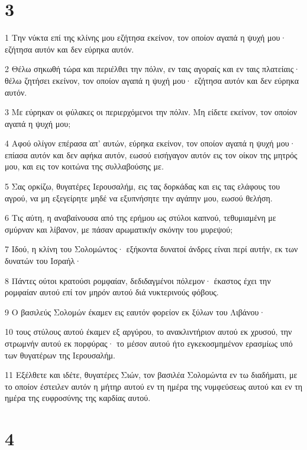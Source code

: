 \chapter{3}

\par 1 Την νύκτα επί της κλίνης μου εζήτησα εκείνον, τον οποίον αγαπά η ψυχή μου· εζήτησα αυτόν και δεν εύρηκα αυτόν.
\par 2 Θέλω σηκωθή τώρα και περιέλθει την πόλιν, εν ταις αγοραίς και εν ταις πλατείαις· θέλω ζητήσει εκείνον, τον οποίον αγαπά η ψυχή μου· εζήτησα αυτόν και δεν εύρηκα αυτόν.
\par 3 Με εύρηκαν οι φύλακες οι περιερχόμενοι την πόλιν. Μη είδετε εκείνον, τον οποίον αγαπά η ψυχή μου;
\par 4 Αφού ολίγον επέρασα απ' αυτών, εύρηκα εκείνον, τον οποίον αγαπά η ψυχή μου· επίασα αυτόν και δεν αφήκα αυτόν, εωσού εισήγαγον αυτόν εις τον οίκον της μητρός μου, και εις τον κοιτώνα της συλλαβούσης με.
\par 5 Σας ορκίζω, θυγατέρες Ιερουσαλήμ, εις τας δορκάδας και εις τας ελάφους του αγρού, να μη εξεγείρητε μηδέ να εξυπνήσητε την αγάπην μου, εωσού θελήση.
\par 6 Τις αύτη, η αναβαίνουσα από της ερήμου ως στύλοι καπνού, τεθυμιαμένη με σμύρναν και λίβανον, με πάσαν αρωματικήν σκόνην του μυρεψού;
\par 7 Ιδού, η κλίνη του Σολομώντος· εξήκοντα δυνατοί άνδρες είναι περί αυτήν, εκ των δυνατών του Ισραήλ·
\par 8 Πάντες ούτοι κρατούσι ρομφαίαν, δεδιδαγμένοι πόλεμον· έκαστος έχει την ρομφαίαν αυτού επί τον μηρόν αυτού διά νυκτερινούς φόβους.
\par 9 Ο βασιλεύς Σολομών έκαμεν εις εαυτόν φορείον εκ ξύλων του Λιβάνου·
\par 10 τους στύλους αυτού έκαμεν εξ αργύρου, το ανακλιντήριον αυτού εκ χρυσού, την στρωμνήν αυτού εκ πορφύρας· το μέσον αυτού ήτο εγκεκοσμημένον ερασμίως υπό των θυγατέρων της Ιερουσαλήμ.
\par 11 Εξέλθετε και ιδέτε, θυγατέρες Σιών, τον βασιλέα Σολομώντα εν τω διαδήματι, με το οποίον έστειλεν αυτόν η μήτηρ αυτού εν τη ημέρα της νυμφεύσεως αυτού και εν τη ημέρα της ευφροσύνης της καρδίας αυτού.

\chapter{4}

